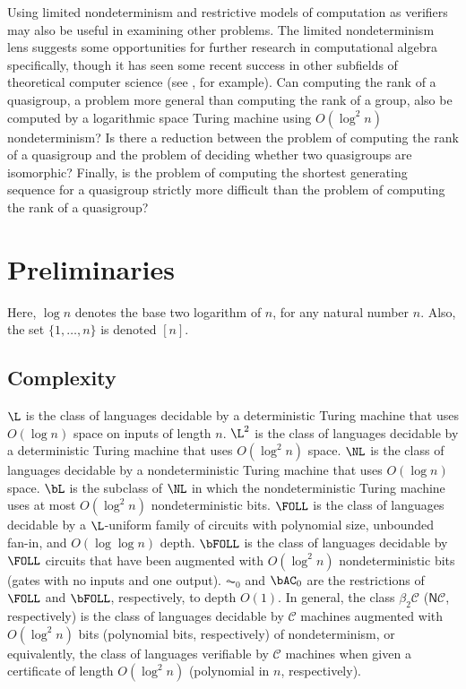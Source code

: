 \documentclass{article}
\begin{document}
Using limited nondeterminism and restrictive models of computation as verifiers may also be useful in examining other problems.
The limited nondeterminism lens suggests some opportunities for further research in computational algebra specifically, though it has seen some recent success in other subfields of theoretical computer science (see \autocite{gottlob13}, for example).
Can computing the rank of a quasigroup, a problem more general than computing the rank of a group, also be computed by a logarithmic space Turing machine using $O(\log^2 n)$ nondeterminism?
Is there a reduction between the problem of computing the rank of a quasigroup and the problem of deciding whether two quasigroups are isomorphic?
Finally, is the problem of computing the shortest generating sequence for a quasigroup strictly more difficult than the problem of computing the rank of a quasigroup?

\section{Preliminaries}

Here, $\log n$ denotes the base two logarithm of $n$, for any natural number $n$.
Also, the set $\{1, \dotsc, n\}$ is denoted $[n]$.

\subsection{Complexity}

$\L$ is the class of languages decidable by a deterministic Turing machine that uses $O(\log n)$ space on inputs of length $n$.
$\L^2$ is the class of languages decidable by a deterministic Turing machine that uses $O(\log^2 n)$ space.
$\NL$ is the class of languages decidable by a nondeterministic Turing machine that uses $O(\log n)$ space.
$\bL$ is the subclass of $\NL$ in which the nondeterministic Turing machine uses at most $O(\log^2 n)$ nondeterministic bits.
$\FOLL$ is the class of languages decidable by a $\L$-uniform family of circuits with polynomial size, unbounded fan-in, and $O(\log \log n)$ depth.
$\bFOLL$ is the class of languages decidable by $\FOLL$ circuits that have been augmented with $O(\log^2 n)$ nondeterministic bits (gates with no inputs and one output).
$\AC_0$ and $\bAC_0$ are the restrictions of $\FOLL$ and $\bFOLL$, respectively, to depth $O(1)$.
In general, the class $\beta_2 \mathcal{C}$ ($\mathsf{N} \mathcal{C}$, respectively) is the class of languages decidable by $\mathcal{C}$ machines augmented with $O(\log^2 n)$ bits (polynomial bits, respectively) of nondeterminism, or equivalently, the class of languages verifiable by $\mathcal{C}$ machines when given a certificate of length $O(\log^2 n)$ (polynomial in $n$, respectively).
\end{document}

